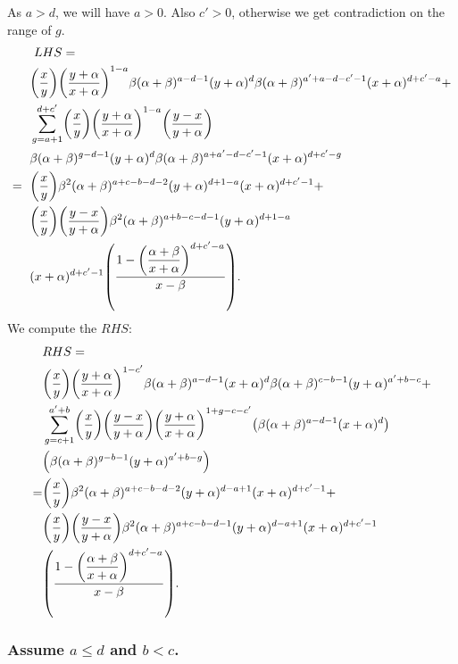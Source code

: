 \documentclass[ALCO, Unicode]{cedram}
\DeclarePairedDelimiter\autobracket{(}{)}
\newcommand{\br}[1]{\autobracket*{#1}}
\begin{document}
As $a>d$, we will have $a>0$. Also $c'>0$, otherwise we get contradiction on the range of $g$.
{\allowdisplaybreaks
\begin{align*}
&\text{  }LHS=\text{ }\\
&\br{\dfrac{x}{y}}\br{\dfrac{y+\alpha}{x+\alpha}}^{1-a}
            \beta(\alpha+\beta)^{a-d-1}(y+\alpha)^{d}\beta(\alpha+
            \beta)^{a'+a-d-c'-1}(x+\alpha)^{d+c'-a}+\\
            &\sum^{d+c'}_{g=a+1}\br{\dfrac{x}{y}}\br{\dfrac{y+\alpha}{x+\alpha}}^{1-a}\br{\dfrac{y-x}{y+\alpha}}\\ 
            & \beta (\alpha+\beta)^{g-d-1}(y+\alpha)^{d}\beta (\alpha+\beta)^{a+a'-d-c'-1}(x+\alpha)^{d+c'-g}\\
            =\text{  }&\br{\dfrac{x}{y}}\beta^{2}(\alpha+\beta)^{a+c-b-d-2}(y+\alpha)^{d+1-a}(x+\alpha)^{d+c'-1}+\\
            &\br{\dfrac{x}{y}}\br{\dfrac{y-x}{y+\alpha}}\beta^2 (\alpha+\beta)^{a+b-c-d-1}(y+\alpha)^{d+1-a}\\&(x+\alpha)^{d+c'-1}\br{\dfrac{1-\br{\dfrac{\alpha+\beta}{x+\alpha}}^{d+c'-a}}{x-\beta}}.
\end{align*}}
We compute the $RHS$:
{\allowdisplaybreaks
\begin{align*}
&RHS=\text{ }\\
& \br{\dfrac{x}{y}}\br{\dfrac{y+\alpha}{x+\alpha}}^{1-c'} \beta(\alpha+\beta)^{a-d-1}(x+\alpha)^{d}\beta (\alpha+\beta)^{c-b-1}(y+\alpha)^{a'+b-c}+\\
             &\sum^{a'+b}_{g=c+1} \br{\dfrac{x}{y}}\br{\dfrac{y-x}{y+\alpha}}\br{\dfrac{y+\alpha}{x+\alpha}}^{1+g-c-c'}\br{\beta(\alpha+\beta)^{a-d-1}(x+\alpha)^{d}}\\
             &\br{\beta (\alpha+\beta)^{g-b-1}(y+\alpha)^{a'+b-g}}\\
             =&\br{\dfrac{x}{y}}\beta^2 (\alpha+\beta)^{a+c-b-d-2}(y+\alpha)^{d-a+1}(x+\alpha)^{d+c'-1}+\\
             & \br{\dfrac{x}{y}}\br{\dfrac{y-x}{y+\alpha}}\beta^2 (\alpha+\beta)^{a+c-b-d-1}(y+\alpha)^{d-a+1}(x+\alpha)^{d+c'-1}\\
             &\br{\dfrac{1-\br{\dfrac{\alpha+\beta}{x+\alpha}}^{d+c'-a}}{x-\beta}}.
\end{align*}
}



\subsubsection{Assume \texorpdfstring{$a\leq d$ and $b<c$}{a<=d and b<c}.}
\end{document}
